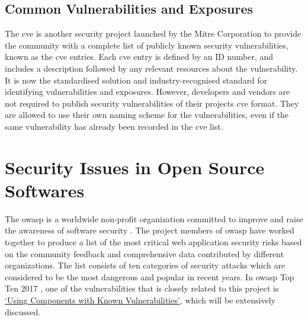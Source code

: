 \documentclass[12pt, a4paper]{report}
\begin{document}
\subsection{Common Vulnerabilities and Exposures}
The \acrfull{cve} is another security project launched by the Mitre Corporation \cite{cve} to
provide the community with a complete list of publicly known security vulnerabilities, known as the
\acrshort{cve} entries. Each \acrshort{cve} entry is defined by an ID number, and includes a
description followed by any relevant resources about the vulnerability. It is now the standardised
solution and industry-recognised standard for identifying vulnerabilities and exposures. However,
developers and vendors are not required to publish security vulnerabilities of their projects
\acrshort{cve} format. They are allowed to use their own naming scheme for the vulnerabilities, even
if the same vulnerability has already been recorded in the \acrshort{cve} list.

\section{Security Issues in Open Source Softwares}
The \acrfull{owasp} is a worldwide non-profit organization committed to improve and raise the
awareness of software security \cite{owasp_home}. The project members of \acrshort{owasp} have
worked together to produce a list of the most critical web application security risks based on the
community feedback and comprehensive data contributed by different organizations. The list consists
of ten categories of security attacks which are considered to be the most dangerous and popular in
recent years. In \acrshort{owasp} Top Ten 2017 \cite{owasp_top10}, one of the vulnerabilities that
is closely related to this project is \hyperref[subsec:components]{`Using Components with Known
Vulnerabilities'}, which will be extensively discussed.
\end{document}
